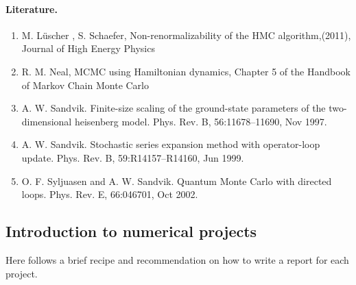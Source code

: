 \documentclass[%
oneside,                 %
final,                   %
10pt]{article}
\begin{document}
\noindent
\paragraph{Literature.}
\begin{enumerate}
\item M. L{\"{u}}scher , S. Schaefer, Non-renormalizability of the HMC algorithm,(2011), Journal of High Energy Physics

\item R. M. Neal, MCMC using Hamiltonian dynamics, Chapter 5 of the Handbook of Markov Chain Monte Carlo

\item A. W. Sandvik. Finite-size scaling of the ground-state parameters of the two-dimensional heisenberg model. Phys. Rev. B, 56:11678–11690, Nov 1997.

\item A. W. Sandvik. Stochastic series expansion method with operator-loop update. Phys. Rev. B, 59:R14157–R14160, Jun 1999.

\item O. F. Syljuasen and A. W. Sandvik. Quantum Monte Carlo with directed loops. Phys. Rev. E, 66:046701, Oct 2002.~
\end{enumerate}

\noindent
\subsection*{Introduction to numerical projects}

Here follows a brief recipe and recommendation on how to write a report for each
project.
\end{document}
